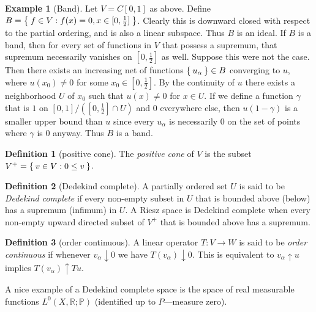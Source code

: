 \documentclass[letterpaper,10pt,oneside,onecolumn,reqno]{amsart}
\renewcommand{\P}{\mathbb P}
\newcommand{\R}{\mathbb R}
\theoremstyle{definition}
\newtheorem{defn}{Definition}
\newtheorem{exa}{Example}
\begin{document}
\begin{exa}[Band]\label{exa:2}
  Let $V=C[0,1]$ as above. Define $B = \Set{f \in V : f(x) = 0, x \in
    [0, \frac{1}{2}]}$. Clearly this is downward closed with respect
  to the partial ordering, and is also a linear subspace. Thus $B$ is
  an ideal. If $B$ is a band, then for every set of functions in $V$
  that possess a supremum, that supremum necessarily vanishes on
  $[0,\frac{1}{2}]$ as well. Suppose this were not the case. Then
  there exists an increasing net of functions $\Set{u_{\alpha}} \in B$
  converging to $u$, where $u(x_{0}) \neq 0 $ for some $x_0 \in
  [0,\frac{1}{2}]$. By the continuity of $u$ there exists a
  neighborhood $U$ of $x_0$ such that $u(x) \neq 0$ for $x \in U$. If
  we define a function $\gamma$ that is $1$ on $[0,1]/([0,\frac{1}{2}]
  \cap U)$ and $0$ everywhere else, then $u(1 - \gamma)$ is a smaller
  upper bound than $u$ since every $u_{\alpha}$ is necessarily $0$ on
  the set of points where $\gamma$ is $0$ anyway. Thus $B$ is a band.

\end{exa}

\begin{framed}
  \begin{defn}[positive cone]\label{def:12}
    The \emph{positive cone} of $V$ is the subset
    $V^+ = \Set{v \in V : 0 \leq v}$.
  \end{defn}

\begin{defn}[Dedekind complete]\label{def:13}
  A partially ordered set $U$ is said to be \emph{Dedekind complete} if every non-empty subset in $U$
  that is bounded above (below) has a supremum (infimum) in $U$. A
  Riesz space is Dedekind complete when every non-empty upward
  directed subset of $V^+$ that is bounded above has a supremum.
\end{defn}

\begin{defn}[order continuous]\label{def:14}
  A linear operator $T : V \to W$ is said to be \emph{order continuous} if whenever $v_{\alpha} \downarrow
  0$ we have $T(v_{\alpha}) \downarrow 0$. This is equivalent to
  $v_{\alpha} \uparrow u$ implies $T(v_{\alpha}) \uparrow Tu$.
\end{defn}
\end{framed}

A nice example of a Dedekind complete space is the space of
real measurable functions $L^0(X,\R;\P)$ (identified up to $P$---measure zero).
\end{document}
